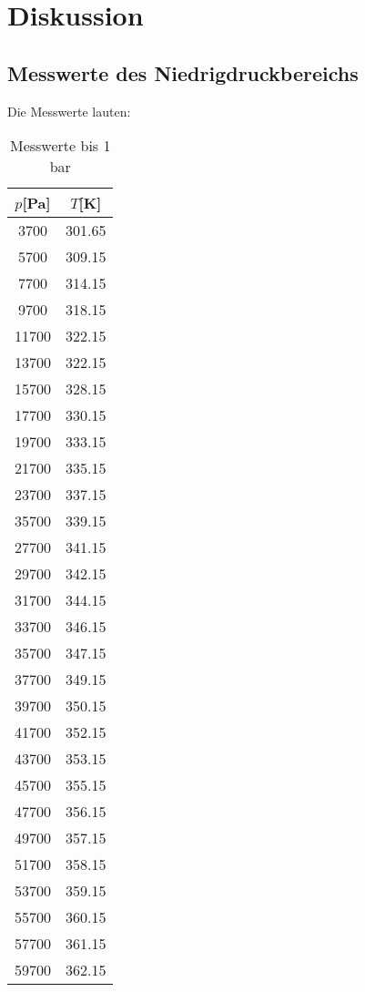 \section{Diskussion}
\label{sec:Diskussion}
\subsection{Messwerte des Niedrigdruckbereichs}
Die Messwerte lauten:
\begin{table}[H]
\centering
   \caption{Messwerte bis 1 bar}
   \label{tab:ndr}
   \begin{tabular}{c c}
   \toprule
    $p$[Pa] & $T$[K] \\
    \midrule
      3700 &   301.65 \\  
      5700 &   309.15 \\  
      7700 &   314.15 \\  
      9700 &   318.15 \\ 
      11700 &   322.15 \\ 
      13700 &   322.15 \\ 
      15700 &   328.15 \\ 
      17700 &   330.15 \\ 
      19700 &   333.15 \\ 
      21700 &   335.15 \\ 
      23700 &   337.15 \\ 
      35700 &   339.15 \\ 
      27700 &   341.15 \\ 
      29700 &   342.15 \\ 
      31700 &   344.15 \\ 
      33700 &   346.15 \\ 
      35700 &   347.15 \\ 
      37700 &   349.15 \\
      39700 &   350.15 \\ 
      41700 &   352.15 \\ 
      43700 &   353.15 \\ 
      45700 &   355.15 \\ 
      47700 &   356.15 \\ 
      49700 &   357.15 \\ 
      51700 &   358.15 \\ 
      53700 &   359.15 \\ 
      55700 &   360.15 \\ 
      57700 &   361.15 \\ 
      59700 &   362.15 \\ 

\end{tabular}
\end{table}
